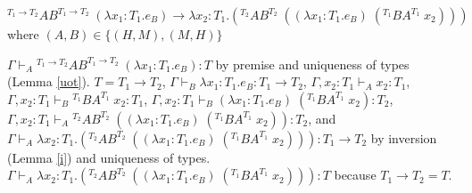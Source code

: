 \begin{case}
$^{T_{1}\rightarrow T_{2}}AB^{T_{1}\rightarrow T_{2}}\;(\lambda x_{1}:T_{1}.e_{B})\rightarrow\lambda x_{2}:T_{1}.(^{T_{2}}AB^{T_{2}}\;((\lambda x_{1}:T_{1}.e_{B})\;(^{T_{1}}BA^{T_{1}}\;x_{2})))$ where $(A,B)\in\lbrace(H,M),(M,H)\rbrace$

$\Gamma\vdash_{A}{^{T_{1}\rightarrow T_{2}}}AB^{T_{1}\rightarrow T_{2}}\;(\lambda x_{1}:T_{1}.e_{B}):T$ by premise and uniqueness of types (Lemma \ref{uot}).  $T=T_{1}\rightarrow T_{2}$, $\Gamma\vdash_{B}\lambda x_{1}:T_{1}.e_{B}:T_{1}\rightarrow T_{2}$, $\Gamma,x_{2}:T_{1}\vdash_{A}x_{2}:T_{1}$, $\Gamma,x_{2}:T_{1}\vdash_{B}{^{T_{1}}B}A^{T_{1}}\;x_{2}:T_{1}$, $\Gamma,x_{2}:T_{1}\vdash_{B}(\lambda x_{1}:T_{1}.e_{B})\;(^{T_{1}}BA^{T_{1}}\;x_{2}):T_{2}$, $\Gamma,x_{2}:T_{1}\vdash_{A}{^{T_{2}}A}B^{T_{2}}\;((\lambda x_{1}:T_{1}.e_{B})\;(^{T_{1}}BA^{T_{1}}\;x_{2})):T_{2}$, and $\Gamma\vdash_{A}\lambda x_{2}:T_{1}.(^{T_{2}}AB^{T_{2}}\;((\lambda x_{1}:T_{1}.e_{B})\;(^{T_{1}}BA^{T_{1}}\;x_{2}))):T_{1}\rightarrow T_{2}$ by inversion (Lemma \ref{i}) and uniqueness of types.  $\Gamma\vdash_{A}\lambda x_{2}:T_{1}.(^{T_{2}}AB^{T_{2}}\;((\lambda x_{1}:T_{1}.e_{B})\;(^{T_{1}}BA^{T_{1}}\;x_{2}))):T$ because $T_{1}\rightarrow T_{2}=T$.
\end{case}